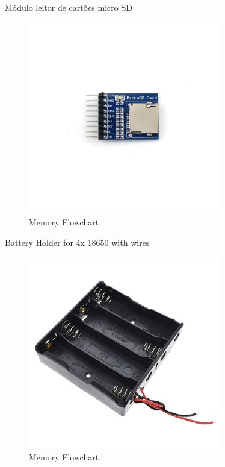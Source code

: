 Módulo leitor de cartões micro SD

\begin{figure}[H]
    \centering
    \includegraphics[width=0.75\textwidth]{images/chapter/design/components/sd_support.jpg}  %
    \caption{Memory Flowchart}
    \label{fig:Memory Flowchart}        
\end{figure}

Battery Holder for 4x 18650 with wires

\begin{figure}[H]
    \centering
    \includegraphics[width=0.75\textwidth]{images/chapter/design/components/battery-holder.jpg}  %
    \caption{Memory Flowchart}
    \label{fig:Memory Flowchart}        
\end{figure}

